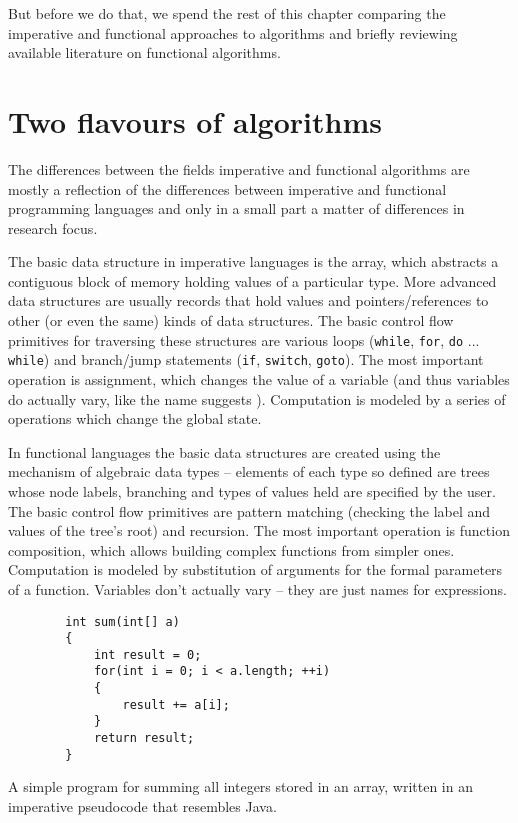 \documentclass[declaration,mgr,english,shortabstract]{iithesis}
\newcommand{\m}[1]{\texttt{#1}}
\begin{document}
But before we do that, we spend the rest of this chapter comparing the imperative and functional approaches to algorithms and briefly reviewing available literature on functional algorithms.

\section{Two flavours of algorithms} \label{ch1s2}

The differences between the fields imperative and functional algorithms are mostly a reflection of the differences between imperative and functional programming languages and only in a small part a matter of differences in research focus.

The basic data structure in imperative languages is the array, which abstracts a contiguous block of memory holding values of a particular type. More advanced data structures are usually records that hold values and pointers/references to other (or even the same) kinds of data structures. The basic control flow primitives for traversing these structures are various loops (\m{while}, \m{for}, \m{do} ... \m{while}) and branch/jump statements (\m{if}, \m{switch}, \m{goto}). The most important operation is assignment, which changes the value of a variable (and thus variables do actually vary, like the name suggests \cite{WordsMatter}). Computation is modeled by a series of operations which change the global state.

In functional languages the basic data structures are created using the mechanism of algebraic data types -- elements of each type so defined are trees whose node labels, branching and types of values held are specified by the user. The basic control flow primitives are pattern matching (checking the label and values of the tree's root) and recursion. The most important operation is function composition, which allows building complex functions from simpler ones. Computation is modeled by substitution of arguments for the formal parameters of a function. Variables don't actually vary -- they are just names for expressions. \cite{WordsMatter}

\begin{listing}[H]
    \begin{verbatim}
        int sum(int[] a)
        {
            int result = 0;
            for(int i = 0; i < a.length; ++i)
            {
                result += a[i];
            }
            return result;
        }
    \end{verbatim}
    \caption{A simple program for summing all integers stored in an array, written in an imperative pseudocode that resembles Java.}
\end{listing}
\end{document}
